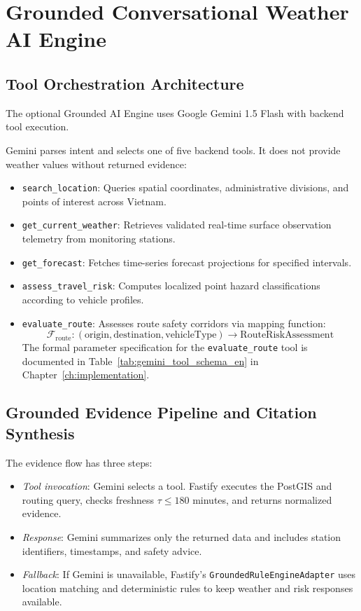 \section{Grounded Conversational Weather AI Engine}
\label{sec:grounded_ai_assistant}

\subsection{Tool Orchestration Architecture}
The optional Grounded AI Engine uses Google Gemini 1.5 Flash with backend tool execution.

Gemini parses intent and selects one of five backend tools. It does not provide weather values without returned evidence:
\begin{itemize}
    \item[-] \texttt{search\_location}: Queries spatial coordinates, administrative divisions, and points of interest across Vietnam.
    \item[-] \texttt{get\_current\_weather}: Retrieves validated real-time surface observation telemetry from monitoring stations.
    \item[-] \texttt{get\_forecast}: Fetches time-series forecast projections for specified intervals.
    \item[-] \texttt{assess\_travel\_risk}: Computes localized point hazard classifications according to vehicle profiles.
    \item[-] \texttt{evaluate\_route}: Assesses route safety corridors via mapping function:
    \begin{equation}
    \label{eq:tool_evaluate_route_en}
    \mathcal{F}_{\text{route}}: (\text{origin}, \text{destination}, \text{vehicleType}) \longrightarrow \text{RouteRiskAssessment}
    \end{equation}
    The formal parameter specification for the \texttt{evaluate\_route} tool is documented in Table~\ref{tab:gemini_tool_schema_en} in Chapter~\ref{ch:implementation}.
\end{itemize}

\subsection{Grounded Evidence Pipeline and Citation Synthesis}
The evidence flow has three steps:
\begin{itemize}
    \item[-] \textit{Tool invocation}: Gemini selects a tool. Fastify executes the PostGIS and routing query, checks freshness $\tau \le 180$ minutes, and returns normalized evidence.
    \item[-] \textit{Response}: Gemini summarizes only the returned data and includes station identifiers, timestamps, and safety advice.
    \item[-] \textit{Fallback}: If Gemini is unavailable, Fastify's \texttt{GroundedRuleEngineAdapter} uses location matching and deterministic rules to keep weather and risk responses available.
\end{itemize}
